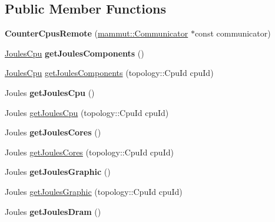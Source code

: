 \subsection*{Public Member Functions}
\begin{DoxyCompactItemize}
\item 
\hypertarget{classmammut_1_1energy_1_1CounterCpusRemote_aa56624f5cad1a23cc5fc50b2bdb60a02}{{\bfseries Counter\-Cpus\-Remote} (\hyperlink{classmammut_1_1Communicator}{mammut\-::\-Communicator} $\ast$const communicator)}\label{classmammut_1_1energy_1_1CounterCpusRemote_aa56624f5cad1a23cc5fc50b2bdb60a02}

\item 
\hypertarget{classmammut_1_1energy_1_1CounterCpusRemote_acee999bb9b7170e6128cff24ee135a39}{\hyperlink{classmammut_1_1energy_1_1JoulesCpu}{Joules\-Cpu} {\bfseries get\-Joules\-Components} ()}\label{classmammut_1_1energy_1_1CounterCpusRemote_acee999bb9b7170e6128cff24ee135a39}

\item 
\hyperlink{classmammut_1_1energy_1_1JoulesCpu}{Joules\-Cpu} \hyperlink{classmammut_1_1energy_1_1CounterCpusRemote_a01ade74cb22a24f39d294257d764fbf3}{get\-Joules\-Components} (topology\-::\-Cpu\-Id cpu\-Id)
\item 
\hypertarget{classmammut_1_1energy_1_1CounterCpusRemote_a9cabce3a60a6b55a7d7a7b807474d68d}{Joules {\bfseries get\-Joules\-Cpu} ()}\label{classmammut_1_1energy_1_1CounterCpusRemote_a9cabce3a60a6b55a7d7a7b807474d68d}

\item 
Joules \hyperlink{classmammut_1_1energy_1_1CounterCpusRemote_a1c55fc9f3bbcaed7d16e526175eca00c}{get\-Joules\-Cpu} (topology\-::\-Cpu\-Id cpu\-Id)
\item 
\hypertarget{classmammut_1_1energy_1_1CounterCpusRemote_a555fbad77c51f8cc45829d7a66570b37}{Joules {\bfseries get\-Joules\-Cores} ()}\label{classmammut_1_1energy_1_1CounterCpusRemote_a555fbad77c51f8cc45829d7a66570b37}

\item 
Joules \hyperlink{classmammut_1_1energy_1_1CounterCpusRemote_aa6f49a650b0df6aecb1e56ffeca15bd7}{get\-Joules\-Cores} (topology\-::\-Cpu\-Id cpu\-Id)
\item 
\hypertarget{classmammut_1_1energy_1_1CounterCpusRemote_aadd114f00607baadb4a9d449da8969ee}{Joules {\bfseries get\-Joules\-Graphic} ()}\label{classmammut_1_1energy_1_1CounterCpusRemote_aadd114f00607baadb4a9d449da8969ee}

\item 
Joules \hyperlink{classmammut_1_1energy_1_1CounterCpusRemote_af886a7df65acafc4bb762fb45a91bfaa}{get\-Joules\-Graphic} (topology\-::\-Cpu\-Id cpu\-Id)
\item 
\hypertarget{classmammut_1_1energy_1_1CounterCpusRemote_a668674116f076a30f1e908afcd3931c3}{Joules {\bfseries get\-Joules\-Dram} ()}\label{classmammut_1_1energy_1_1CounterCpusRemote_a668674116f076a30f1e908afcd3931c3}


\end{DoxyCompactItemize}
